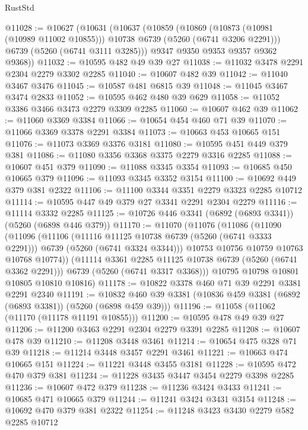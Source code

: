 \begin{lexlean}{RustStd}
\begin{coremodule}
@11028 := @10627
    (@10631
      (@10637
        (@10859
          (@10869 (@10873 (@10981 (@10989 @11002 @10855))) @10738 @6739 (@5260 (@6741 @3206 @2291)))
          @6739
          (@5260 (@6741 @3111 @3285)))
        @9347
        @9350
        @9353
        @9357
        @9362
        @9368))
@11032 := @10595 @482 @49 @39 @27
@11038 := @11032 @3478 @2291 @2304 @2279 @3302 @2285
@11040 := @10607 @482 @39
@11042 := @11040 @3467 @3476
@11045 := @10587 @481 @6815 @39
@11048 := @11045 @3467 @3474 @2833
@11052 := @10595 @462 @480 @39 @629
@11058 := @11052 @3386 @3466 @3473 @2279 @3309 @2285
@11060 := @10607 @462 @39
@11062 := @11060 @3369 @3384
@11066 := @10654 @454 @460 @71 @39
@11070 := @11066 @3369 @3378 @2291 @3384
@11073 := @10663 @453 @10665 @151
@11076 := @11073 @3369 @3376 @3181
@11080 := @10595 @451 @449 @379 @381
@11086 := @11080 @3356 @3368 @3375 @2279 @3316 @2285
@11088 := @10607 @451 @379
@11090 := @11088 @3345 @3354
@11093 := @10685 @450 @10665 @379
@11096 := @11093 @3345 @3352 @3154
@11100 := @10692 @449 @379 @381 @2322
@11106 := @11100 @3344 @3351 @2279 @3323 @2285 @10712
@11114 := @10595 @447 @49 @379 @27 @3341 @2291 @2304 @2279
@11116 := @11114 @3332 @2285
@11125 := @10726 @446 @3341 (@6892 (@6893 @3341)) (@5260 (@6898 @446 @379))
@11170 := @11070
    (@11076
      (@11086
        (@11090
          (@11096
            (@11106
              (@11116 @11125 @10738 @6739 (@5260 (@6741 @3333 @2291)))
              @6739
              (@5260 (@6741 @3324 @3344)))
            @10753
            @10756
            @10759
            @10763
            @10768
            @10774))
        (@11114 @3361 @2285 @11125 @10738 @6739 (@5260 (@6741 @3362 @2291)))
        @6739
        (@5260 (@6741 @3317 @3368)))
      @10795
      @10798
      @10801
      @10805
      @10810
      @10816)
@11178 := @10822 @3378 @460 @71 @39 @2291 @3381 @2291 @2340
@11191 := @10832 @460 @39 @3381 (@10836 @459 @3381 (@6892 (@6893 @3381)) (@5260 (@6898 @459 @39)))
@11196 := @11058 (@11062 (@11170 (@11178 @11191 @10855)))
@11200 := @10595 @478 @49 @39 @27
@11206 := @11200 @3463 @2291 @2304 @2279 @3391 @2285
@11208 := @10607 @478 @39
@11210 := @11208 @3448 @3461
@11214 := @10654 @475 @328 @71 @39
@11218 := @11214 @3448 @3457 @2291 @3461
@11221 := @10663 @474 @10665 @151
@11224 := @11221 @3448 @3455 @3181
@11228 := @10595 @472 @470 @379 @381
@11234 := @11228 @3435 @3447 @3454 @2279 @3398 @2285
@11236 := @10607 @472 @379
@11238 := @11236 @3424 @3433
@11241 := @10685 @471 @10665 @379
@11244 := @11241 @3424 @3431 @3154
@11248 := @10692 @470 @379 @381 @2322
@11254 := @11248 @3423 @3430 @2279 @582 @2285 @10712

\end{coremodule}
\end{lexlean}
